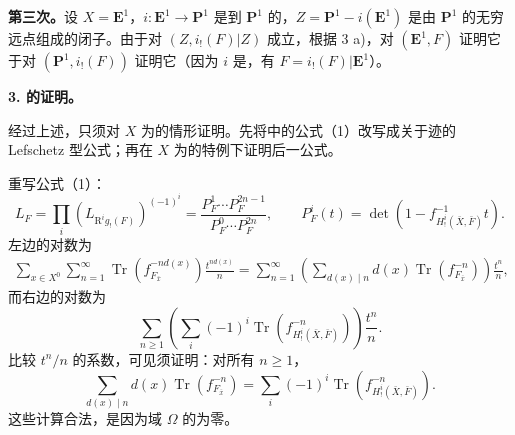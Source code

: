 \textbf{第三次。}设 $X=\mathbf E^1$，$i:\mathbf E^1\to\mathbf P^1$ 是到 $\mathbf P^1$ 的，$Z=\mathbf P^1-i(\mathbf E^1)$ 是由 $\mathbf P^1$ 的无穷远点组成的闭子。由于对 $(Z,i_!(F)|Z)$ 成立，根据 3 a)，对 $(\mathbf E^1,F)$ 证明它于对 $(\mathbf P^1,i_!(F))$ 证明它（因为 $i$ 是，有 $F=i_!(F)|\mathbf E^1$）。

\textbf{3. 的证明。}

经过上述，只须对 $X$ 为的情形证明。先将中的公式（1）改写成关于迹的 Lefschetz 型公式；再在 $X$ 为的特例下证明后一公式。

重写公式（1）：
\[
L_F=\prod_i(L_{\mathrm R^ig_!(F)})^{(-1)^i}
=\frac{P_F^1\cdots P_F^{2n-1}}{P_F^0\cdots P_F^{2n}},
\qquad P_F^i(t)=\det(1-f_{H_!^i(\bar X,\bar F)}^{-1}t).
\]
左边的对数为
\[
\begin{aligned}
\sum_{x\in X^0}\sum_{n=1}^{\infty}\operatorname{Tr}(f_{F_{\bar x}}^{-nd(x)})\frac{t^{nd(x)}}n
=\sum_{n=1}^{\infty}\left(\sum_{d(x)\mid n}d(x)\operatorname{Tr}(f_{F_{\bar x}}^{-n})\right)\frac{t^n}n,
\end{aligned}
\]
而右边的对数为
\[
\sum_{n\geq1}\left(\sum_i(-1)^i\operatorname{Tr}(f_{H_!^i(\bar X,\bar F)}^{-n})\right)\frac{t^n}n.
\]
比较 $t^n/n$ 的系数，可见须证明：对所有 $n\geq1$，
\[
\sum_{d(x)\mid n}d(x)\operatorname{Tr}(f_{F_{\bar x}}^{-n})
=\sum_i(-1)^i\operatorname{Tr}(f_{H_!^i(\bar X,\bar F)}^{-n}).
\tag{2}
\]
这些计算合法，是因为域 $\Omega$ 的为零。

